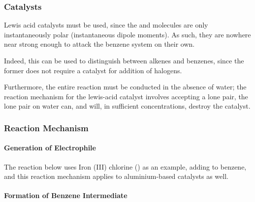 			\subsubsection{Catalysts}

				Lewis acid catalysts must be used, since the  and \ch{\chlorine-\chlorine} molecules are only instantaneously
				polar (instantaneous dipole moments). As such, they are nowhere near strong enough to attack the benzene system on their own.

				Indeed, this can be used to distinguish between alkenes and benzenes, since the former does not require a catalyst for addition
				of halogens.

				Furthermore, the entire reaction must be conducted in the absence of water; the reaction mechanism for the lewis-acid catalyst
				involves accepting a lone pair, the lone pair on water can, and will, in sufficient concentrations, destroy the catalyst.




			\subsubsection{Reaction Mechanism}

				\paragraph{Generation of Electrophile}

				The reaction below uses Iron (III) chlorine () as an example, adding \ch{\chlorine} to benzene,
				and this reaction mechanism applies to aluminium-based catalysts as well.



				\pagebreak

				\paragraph{Formation of Benzene Intermediate}


